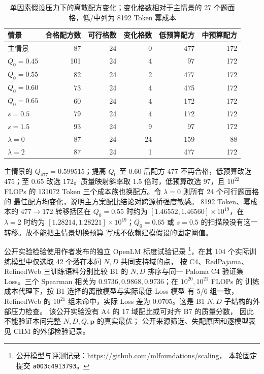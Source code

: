 \begin{table}[htbp]
\centering\small
\caption{单因素假设压力下的离散配方变化；变化格数相对于主情景的 27 个题面格，低/中列为 8192 Token 幂成本}
\label{tab:q3_v8_robustness}
\begin{tabular}{lrrrrr}
\toprule
情景 & 合格配方数 & 可行格数 & 变化格数 & 低预算配方 & 中预算配方\\
\midrule
主情景 & 87 & 24 & 0 & 477 & 172\\
$Q_0=0.45$ & 101 & 24 & 4 & 97 & 172\\
$Q_0=0.55$ & 82 & 24 & 2 & 477 & 172\\
$Q_0=0.60$ & 73 & 24 & 4 & 475 & 172\\
$Q_0=0.65$ & 60 & 24 & 4 & 172 & 172\\
$s=0.5$ & 79 & 24 & 4 & 172 & 172\\
$s=1.5$ & 93 & 24 & 9 & 97 & 172\\
$\lambda=0$ & 87 & 24 & 24 & 159 & 88\\
$\lambda=2$ & 87 & 24 & 1 & 477 & 172\\
\bottomrule
\end{tabular}
\end{table}

主情景的 $Q_{477}=0.599515$；提高 $Q_0$ 至 0.60 后配方 477
不再合格，低预算改选 475；至 0.65 改选 172。质量映射斜率取
1.5 倍时，低预算改选 97，且 $10^{22}$ FLOPs 的 131072 Token
三个成本族也换配方。令 $\lambda=0$ 则所有 24 个可行题面格的
最佳配方均变化，说明主方案配比结论对跨源桥强度敏感。
8192 Token、幂成本的 $477\to172$ 转移括区在 $Q_0=0.55$
时约为 $[1.46552,1.46560]\times10^{19}$，在 $\lambda=2$
时约为 $[1.28214,1.28221]\times10^{19}$；$Q_0=0.65$
或 $s=0.5$ 的扫描段没有这一转移。故不能把主情景切换预算
写成不依赖建模假设的固定阈值。

公开实验检验使用作者发布的独立 OpenLM 标度试验记录
\footnote{公开模型与评测记录：\url{https://github.com/mlfoundations/scaling}，
本轮固定提交 \texttt{a003c4913793}。}，在其
104 个实际训练模型中仅选取 42 个落在本问 $N,D$ 共同支持域的点，
按 C4、RedPajama、RefinedWeb 三训练语料分别比较 B1 的
$N,D$ 排序与同一 Paloma C4 验证集 Loss。三个 Spearman 相关为
$0.9736,0.9868,0.9736$；在 $10^{20},10^{21}$ FLOPs 的
训练成本代理下，按 B1 选择的离散模型与实际最低 Loss 模型
有 5/6 组一致，RefinedWeb 的 $10^{21}$ 组未命中，实际 Loss
差为 $0.0705$。这是 B1 $N,D$ 子结构的外部压力检查。
该公开实验没有 A4 的 17 域配比或可对齐 B7 的质量分数，
因此不能验证本问完整 $N,D,Q,\boldsymbol p$ 的真实最优；
公开来源筛选、失配原因和逐模型表见 CHM 的外部检验记录。

